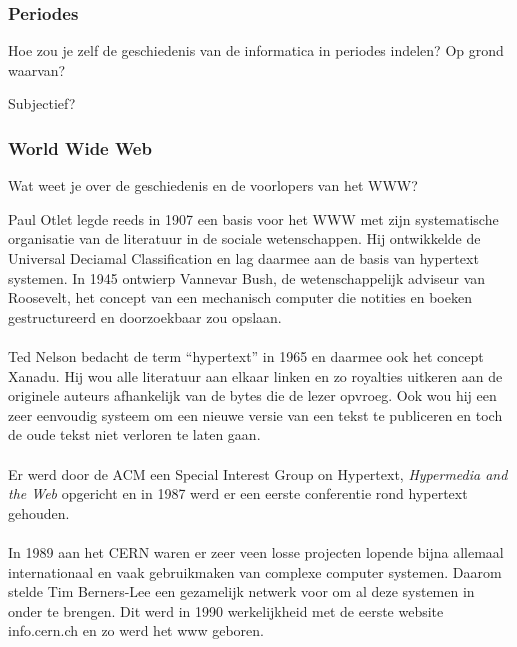 \documentclass[../main.tex]{subfiles}
\begin{document}
\subsubsection{Periodes}
\begin{question}
Hoe zou je zelf de geschiedenis van de informatica in periodes indelen? Op grond waarvan?
\end{question}
\begin{solution} Subjectief?
\end{solution}

\subsubsection{World Wide Web}
\begin{question}
Wat weet je over de geschiedenis en de voorlopers van het WWW?
\end{question}
\begin{solution}
Paul Otlet legde reeds in 1907 een basis voor het WWW met zijn systematische organisatie van de literatuur in de sociale wetenschappen.
Hij ontwikkelde de Universal Deciamal Classification en lag daarmee aan de basis van hypertext systemen.
In 1945 ontwierp Vannevar Bush, de wetenschappelijk adviseur van Roosevelt, het concept van een mechanisch  computer die notities en boeken gestructureerd en doorzoekbaar zou opslaan.
\\\\
Ted Nelson bedacht de term ``hypertext'' in 1965 en daarmee ook het concept Xanadu.
Hij wou alle literatuur aan elkaar linken en zo royalties uitkeren aan de originele auteurs afhankelijk van de bytes die de lezer opvroeg.
Ook wou hij een zeer eenvoudig systeem om een nieuwe versie van een tekst te publiceren en toch de oude tekst niet verloren te laten gaan.
\\\\
Er werd door de ACM een Special Interest Group on Hypertext, \emph{Hypermedia and the Web} opgericht en in 1987 werd er een eerste conferentie rond hypertext gehouden.
\\\\
In 1989 aan het CERN waren er zeer veen losse projecten lopende bijna allemaal internationaal en vaak gebruikmaken van complexe computer systemen.
Daarom stelde Tim Berners-Lee een gezamelijk netwerk voor om al deze systemen in onder te brengen.
Dit werd in 1990 werkelijkheid met de eerste website info.cern.ch en zo werd het www geboren.
\end{solution}
\end{document}
